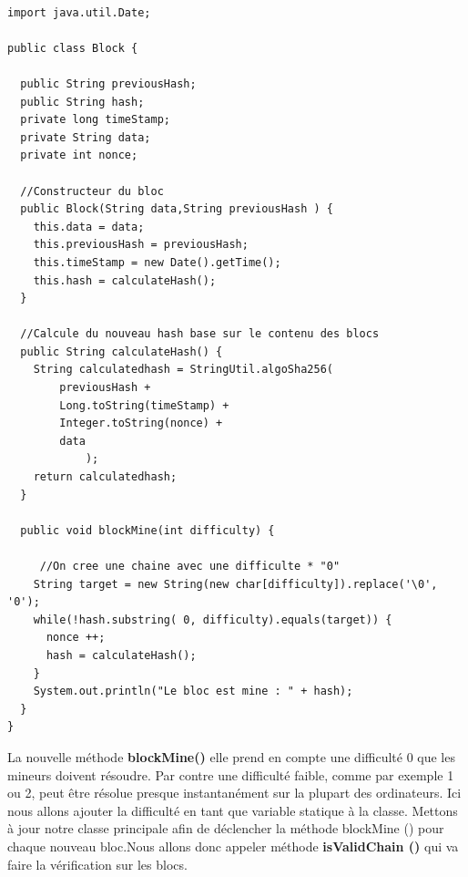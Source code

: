 \documentclass[12pt]{report}
\begin{document}
\begin{lstlisting}

import java.util.Date;

public class Block {

  public String previousHash;
  public String hash;
  private long timeStamp;
  private String data;  
  private int nonce;
	
  //Constructeur du bloc
  public Block(String data,String previousHash ) {
    this.data = data;
    this.previousHash = previousHash;
    this.timeStamp = new Date().getTime();
    this.hash = calculateHash();
  }
	
  //Calcule du nouveau hash base sur le contenu des blocs
  public String calculateHash() {
    String calculatedhash = StringUtil.algoSha256( 
        previousHash +
        Long.toString(timeStamp) +
        Integer.toString(nonce) + 
        data 
            );
    return calculatedhash;
  }

  public void blockMine(int difficulty) {
  
     //On cree une chaine avec une difficulte * "0"
    String target = new String(new char[difficulty]).replace('\0', '0'); 
    while(!hash.substring( 0, difficulty).equals(target)) {
      nonce ++;
      hash = calculateHash();
    }
    System.out.println("Le bloc est mine : " + hash);
  }
}
\end{lstlisting}

\hspace{1cm} La nouvelle méthode \textbf{blockMine()} elle prend en compte une difficulté 0 que les mineurs doivent résoudre. Par contre une difficulté faible, comme par exemple  1 ou 2, peut être résolue presque instantanément sur la plupart des ordinateurs. 
Ici nous allons ajouter la difficulté en tant que variable statique à la classe. Mettons à jour notre classe principale afin de déclencher la méthode blockMine () pour chaque nouveau bloc.Nous allons donc appeler méthode \textbf{isValidChain ()} qui va faire la vérification sur les blocs.
\end{document}
